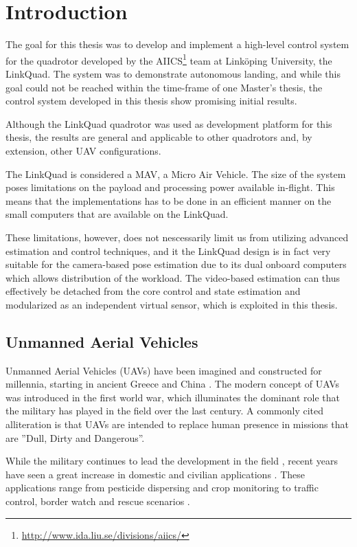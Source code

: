 \chapter{Introduction}
\label{cha:introduction}
    The goal for this thesis was to develop and implement a high-level control system
    for the quadrotor developed by the AIICS\footnote{\url{http://www.ida.liu.se/divisions/aiics/}} team at Linköping University, the LinkQuad.
    The system was to demonstrate autonomous landing, and while this goal
    could not be reached within the time-frame of one Master's thesis, the control
    system developed in this thesis show promising initial results.

    Although the LinkQuad quadrotor was used as development platform for this thesis,
    the results are general and applicable to other quadrotors and, by extension, other UAV configurations.

    The LinkQuad is considered a MAV, a Micro Air Vehicle. %
    The size of the system poses limitations on the payload and processing power
    available in-flight. This means that the implementations has to be done
    in an efficient manner on the small computers that are available on the LinkQuad.

    These limitations, however, does not nescessarily limit us from utilizing advanced estimation
    and control techniques, and it the LinkQuad design is in fact
    very suitable for the camera-based pose estimation due to its dual
    onboard computers which allows distribution of the workload.
    The video-based estimation can thus effectively be detached from the
    core control and state estimation and modularized as an independent
    virtual sensor, which is exploited in this thesis.

\section{Unmanned Aerial Vehicles}
    Unmanned Aerial Vehicles (UAVs) have been imagined and constructed for millennia, starting in ancient Greece and China \citep{valavanis2007advances}.
    The modern concept of UAVs was introduced in the first world war, which
    illuminates the dominant role that the military has played in the field over the
    last century. A commonly cited alliteration is that UAVs are intended to replace
    human presence in missions that are ''Dull, Dirty and Dangerous''.

    While the military continues to lead the development in the field \citep{united2010u}, recent years
    have seen a great increase in domestic and civilian applications \citep{Wong_Bil_2006}.
    These applications range from pesticide dispersing and crop monitoring to
    traffic control, border watch and rescue scenarios \citep{Doherty_Rudol_2007}.

